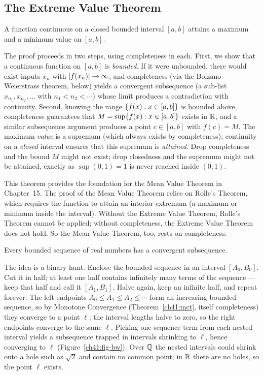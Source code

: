 \subsection*{The Extreme Value Theorem}

\begin{theorem}
\label{ch41:evt}
A function continuous on a closed bounded interval $[a,b]$ attains a maximum and a minimum
value on $[a,b]$.
\end{theorem}

The proof proceeds in two steps, using completeness in each. First, we show that a continuous
function on $[a,b]$ is \emph{bounded}. If it were unbounded, there would exist inputs $x_n$
with $\lvert f(x_n)\rvert\to\infty$, and completeness (via the Bolzano--Weierstrass theorem, below)
yields a convergent subsequence (a sub-list $x_{n_1}, x_{n_2}, \ldots$ with $n_1<n_2<\cdots$)
whose limit produces a contradiction with continuity. Second,
knowing the range $\{f(x):x\in[a,b]\}$ is bounded above, completeness guarantees that
$M=\sup\{f(x):x\in[a,b]\}$ exists in $\mathbb{R}$, and a similar subsequence argument produces a
point $c \in [a,b]$ with $f(c)=M$. The maximum \emph{value} is a supremum (which always exists by
completeness); continuity on a \emph{closed} interval ensures that this supremum is \emph{attained}.
Drop completeness and the bound $M$ might not exist; drop closedness and the supremum might not
be attained, exactly as $\sup(0,1)=1$ is never reached inside $(0,1)$.

This theorem provides the foundation for the Mean Value Theorem in Chapter~15. The proof of the
Mean Value Theorem relies on Rolle's Theorem, which requires the function to attain an interior
extremum (a maximum or minimum inside the interval). Without the Extreme Value Theorem,
Rolle's Theorem cannot be applied; without completeness, the Extreme Value Theorem does not
hold. So the Mean Value Theorem, too, rests on completeness.

\begin{theorem}
\label{ch41:bw}
Every bounded sequence of real numbers has a convergent subsequence.
\end{theorem}

The idea is a binary hunt. Enclose the bounded sequence in an interval $[A_0,B_0]$. Cut it
in half; at least one half contains infinitely many terms of the sequence --- keep that
half and call it $[A_1,B_1]$. Halve again, keep an infinite half, and repeat forever. The
left endpoints $A_0\le A_1\le A_2\le\cdots$ form an increasing bounded sequence, so by
Monotone Convergence (Theorem~\ref{ch41:mct}, itself completeness) they converge to a point
$\ell$; the interval lengths halve to zero, so the right endpoints converge to the same
$\ell$. Picking one sequence term from each nested interval yields a subsequence trapped in
intervals shrinking to $\ell$, hence converging to $\ell$ (Figure~\ref{ch41:fig-bw}). Over
$\mathbb{Q}$ the nested intervals could shrink onto a hole such as $\sqrt2$ and contain no common
point; in $\mathbb{R}$ there are no holes, so the point $\ell$ exists.

